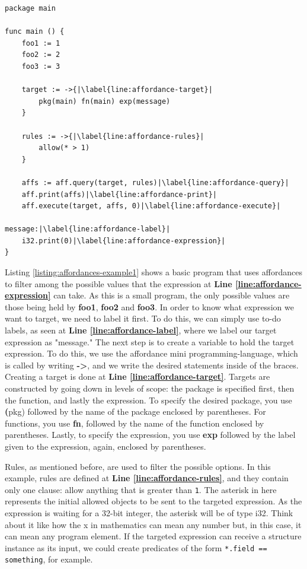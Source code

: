 \documentclass[11pt,fleqn,openany]{book} %
\begin{document}
\begin{lstlisting}[caption={Using Affordances on an Expression},captionpos=b,label={listing:affordances-example1}]
package main

func main () {
  	foo1 := 1
  	foo2 := 2
  	foo3 := 3
	
	target := ->{|\label{line:affordance-target}|
  		pkg(main) fn(main) exp(message)
  	}
	
  	rules := ->{|\label{line:affordance-rules}|
  		allow(* > 1)
  	}
	
  	affs := aff.query(target, rules)|\label{line:affordance-query}|
  	aff.print(affs)|\label{line:affordance-print}|
    aff.execute(target, affs, 0)|\label{line:affordance-execute}|
	
message:|\label{line:affordance-label}|
  	i32.print(0)|\label{line:affordance-expression}|
}
\end{lstlisting}

Listing \ref{listing:affordances-example1} shows a basic program that uses affordances to filter among the possible values that the expression at \textbf{Line \ref{line:affordance-expression}} can take. As this is a small program, the only possible values are those being held by \textbf{foo1}, \textbf{foo2} and \textbf{foo3}. In order to know what expression we want to target, we need to label it first. To do this, we can simply use to-do labels, as seen at \textbf{Line \ref{line:affordance-label}}, where we label our target expression as "message." The next step is to create a variable to hold the target expression. To do this, we use the affordance mini programming-language, which is called by writing \textbf{->{}}, and we write the desired statements inside of the braces. Creating a target is done at \textbf{Line \ref{line:affordance-target}}. Targets are constructed by going down in levels of scope: the package is specified first, then the function, and lastly the expression. To specify the desired package, you use \textbf(pkg) followed by the name of the package enclosed by parentheses. For functions, you use \textbf{fn}, followed by the name of the function enclosed by parentheses. Lastly, to specify the expression, you use \textbf{exp} followed by the label given to the expression, again, enclosed by parentheses.

Rules, as mentioned before, are used to filter the possible options. In this example, rules are defined at \textbf{Line \ref{line:affordance-rules}}, and they contain only one clause: allow anything that is greater than \lstinline{1}. The asterisk in here represents the initial allowed objects to be sent to the targeted expression. As the expression is waiting for a 32-bit integer, the asterisk will be of type i32. Think about it like how the x in mathematics can mean any number but, in this case, it can mean any program element. If the targeted expression can receive a structure instance as its input, we could create predicates of the form \lstinline{*.field == something}, for example.
\end{document}

